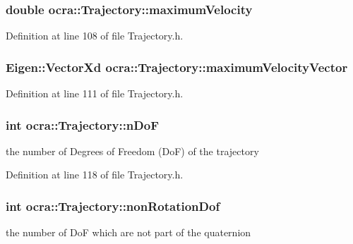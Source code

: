 \subsubsection[{\texorpdfstring{maximum\+Velocity}{maximumVelocity}}]{\setlength{\rightskip}{0pt plus 5cm}double ocra\+::\+Trajectory\+::maximum\+Velocity\hspace{0.3cm}{\ttfamily [protected]}}\hypertarget{classocra_1_1Trajectory_ad79f3742bec59a80c3d641ccdc08012d}{}\label{classocra_1_1Trajectory_ad79f3742bec59a80c3d641ccdc08012d}


Definition at line 108 of file Trajectory.\+h.

\subsubsection[{\texorpdfstring{maximum\+Velocity\+Vector}{maximumVelocityVector}}]{\setlength{\rightskip}{0pt plus 5cm}Eigen\+::\+Vector\+Xd ocra\+::\+Trajectory\+::maximum\+Velocity\+Vector\hspace{0.3cm}{\ttfamily [protected]}}\hypertarget{classocra_1_1Trajectory_a206795c8d7e3bcb38b893d69fe0fa336}{}\label{classocra_1_1Trajectory_a206795c8d7e3bcb38b893d69fe0fa336}


Definition at line 111 of file Trajectory.\+h.

\subsubsection[{\texorpdfstring{n\+DoF}{nDoF}}]{\setlength{\rightskip}{0pt plus 5cm}int ocra\+::\+Trajectory\+::n\+DoF\hspace{0.3cm}{\ttfamily [protected]}}\hypertarget{classocra_1_1Trajectory_a6c5df48ec92b0a64dc39091bc0c17199}{}\label{classocra_1_1Trajectory_a6c5df48ec92b0a64dc39091bc0c17199}
the number of Degrees of Freedom (DoF) of the trajectory 

Definition at line 118 of file Trajectory.\+h.

\subsubsection[{\texorpdfstring{non\+Rotation\+Dof}{nonRotationDof}}]{\setlength{\rightskip}{0pt plus 5cm}int ocra\+::\+Trajectory\+::non\+Rotation\+Dof\hspace{0.3cm}{\ttfamily [protected]}}\hypertarget{classocra_1_1Trajectory_a6ea59dbc9549f00f95a05581dea36415}{}\label{classocra_1_1Trajectory_a6ea59dbc9549f00f95a05581dea36415}
the number of DoF which are not part of the quaternion 

